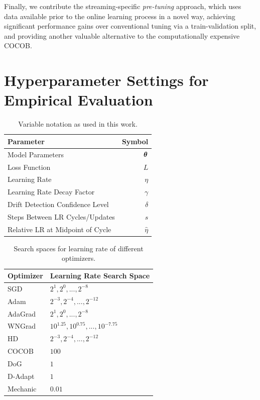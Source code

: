 \documentclass{article} %
\begin{document}
Finally, we contribute the streaming-specific \textit{pre-tuning} approach, which uses data available prior to the online learning process in a novel way, achieving significant performance gains over conventional tuning via a train-validation split, and providing another valuable alternative to the computationally expensive COCOB.




\newpage
\appendix
\section{Hyperparameter Settings for Empirical Evaluation}\label{app:hyperparams}

\begin{table}[h]
   \centering
   \caption{Variable notation as used in this work.}
   \begin{tabular}{lr}
      \toprule
      Parameter                        & Symbol       \\
      \midrule
      Model Parameters                 & ${\bm{\theta}} $   \\
      Loss Function                    & $L$          \\
      Learning Rate                    & $\eta$       \\
      Learning Rate Decay Factor       & $\gamma$     \\
      Drift Detection Confidence Level & $\delta$     \\
      Steps Between LR Cycles/Updates  & $s$          \\
      Relative LR at Midpoint of Cycle & $\hat{\eta}$ \\
      \bottomrule
   \end{tabular}
\end{table}

\begin{table}[h]
   \centering
   \caption{Search spaces for learning rate of different optimizers.}
   \begin{tabular}{l l}
      \toprule
      Optimizer & Learning Rate Search Space                \\
      \midrule
      SGD       & ${2^1, 2^0, ..., 2^{-8}}$                 \\
      Adam      & ${2^{-3}, 2^{-4}, ..., 2^{-12}}$          \\
      AdaGrad   & ${2^1, 2^0, ..., 2^{-8}}$                 \\
      WNGrad    & ${10^{1.25}, 10^{0.75}, ..., 10^{-7.75}}$ \\
      HD        & ${2^{-3}, 2^{-4}, ..., 2^{-12}}$          \\
      COCOB     & $100$                                     \\
      DoG       & $1$                                       \\
      D-Adapt   & $1$                                       \\
      Mechanic  & $0.01$                                    \\
      \bottomrule
   \end{tabular}
\end{table}
\end{document}
